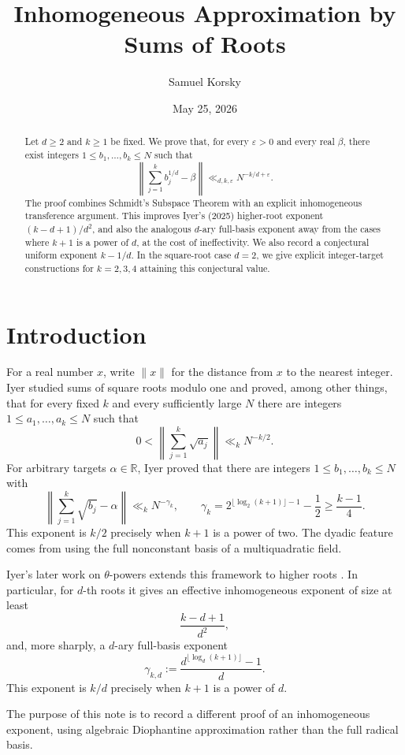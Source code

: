 \documentclass[11pt]{article}
\title{Inhomogeneous Approximation by Sums of Roots}
\author{Samuel Korsky}
\date{May 25, 2026}
\theoremstyle{remark}
\newcommand{\R}{\mathbb R}
\newcommand{\eps}{\varepsilon}
\begin{document}
\maketitle

\begin{abstract}
\noindent
Let $d\geq 2$ and $k\geq 1$ be fixed. We prove that, for every $\eps>0$ and every real $\beta$, there exist integers $1\leq b_1,\ldots,b_k\leq N$ such that
\[
  \left\|\sum_{j=1}^k b_j^{1/d}-\beta\right\|
  \ll_{d,k,\eps} N^{-k/d+\eps}.
\]
The proof combines Schmidt's Subspace Theorem with an explicit inhomogeneous transference argument. This improves Iyer's (2025) higher-root exponent $(k-d+1)/d^2$, and also the analogous $d$-ary full-basis exponent away from the cases where $k+1$ is a power of $d$, at the cost of ineffectivity. We also record a conjectural uniform exponent $k-1/d$. In the square-root case $d=2$, we give explicit integer-target constructions for $k=2,3,4$ attaining this conjectural value.
\end{abstract}

\section{Introduction}

For a real number $x$, write $\|x\|$ for the distance from $x$ to the nearest integer. Iyer \cite{Iyer2024} studied sums of square roots modulo one and proved, among other things, that for every fixed $k$ and every sufficiently large $N$ there are integers $1\leq a_1,\ldots,a_k\leq N$ such that
\[
  0<\left\|\sum_{j=1}^k \sqrt{a_j}\right\| \ll_k N^{-k/2}.
\]
For arbitrary targets $\alpha\in\R$, Iyer proved that there are integers $1\leq b_1,\ldots,b_k\leq N$ with
\[
  \left\|\sum_{j=1}^k\sqrt{b_j}-\alpha\right\|
  \ll_k N^{-\gamma_k},
  \qquad
  \gamma_k=2^{\lfloor \log_2(k+1)\rfloor-1}-\frac12\geq \frac{k-1}{4}.
\]
This exponent is $k/2$ precisely when $k+1$ is a power of two. The dyadic feature comes from using the full nonconstant basis of a multiquadratic field.

\bigskip
\noindent
Iyer's later work on $\theta$-powers extends this framework to higher roots \cite{Iyer2025}. In particular, for $d$-th roots it gives an effective inhomogeneous exponent of size at least
\[
  \frac{k-d+1}{d^2},
\]
and, more sharply, a $d$-ary full-basis exponent
\[
  \gamma_{k,d}:=\frac{d^{\lfloor\log_d(k+1)\rfloor}-1}{d}.
\]
This exponent is $k/d$ precisely when $k+1$ is a power of $d$.

\bigskip
\noindent
The purpose of this note is to record a different proof of an inhomogeneous exponent, using algebraic Diophantine approximation rather than the full radical basis.
\end{document}
